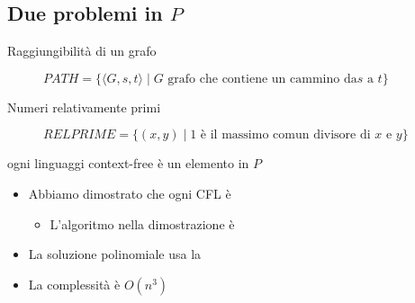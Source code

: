 \subsection{Due problemi in $P$}
\begin{description}
  \item[Raggiungibilità di un grafo] 
    $PATH = \{\langle G,s,t\rangle\mid G\textrm{ grafo che contiene un cammino da} s \textrm{ a }t\}$
  \item[Numeri relativamente primi]
    $RELPRIME = \{(x,y)\mid 1\textrm{ è il massimo comun divisore di }x \textrm{ e }y\}$
\end{description}
\begin{theorem}
  ogni linguaggi context-free è un elemento in $P$ 
\end{theorem}
\begin{itemize}
  \item Abbiamo dimostrato che ogni CFL è 
    \begin{itemize}
      \item L'algoritmo nella dimostrazione è 
    \end{itemize}
  \item La soluzione polinomiale usa la 
  \item La complessità è $O(n^3)$ 
\end{itemize}

